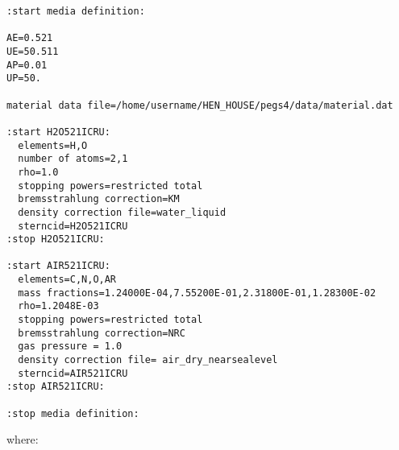 \begin{verbatim}
:start media definition:

AE=0.521
UE=50.511
AP=0.01
UP=50.

material data file=/home/username/HEN_HOUSE/pegs4/data/material.dat

:start H2O521ICRU:
  elements=H,O
  number of atoms=2,1
  rho=1.0
  stopping powers=restricted total
  bremsstrahlung correction=KM
  density correction file=water_liquid
  sterncid=H2O521ICRU
:stop H2O521ICRU:

:start AIR521ICRU:
  elements=C,N,O,AR
  mass fractions=1.24000E-04,7.55200E-01,2.31800E-01,1.28300E-02
  rho=1.2048E-03
  stopping powers=restricted total
  bremsstrahlung correction=NRC
  gas pressure = 1.0
  density correction file= air_dry_nearsealevel  
  sterncid=AIR521ICRU
:stop AIR521ICRU:

:stop media definition:
\end{verbatim}
where:
